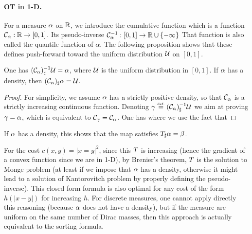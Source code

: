 \paragraph{OT in 1-D.}

For a measure $\alpha$ on $\mathbb{R}$, we introduce the cumulative function
which is a function $\mathcal{C}_{\alpha} : \mathbb{R} \rightarrow [0,1]$.
%
Its pseudo-inverse  $\mathcal{C}_{\alpha}^{-1} : [0,1] \rightarrow \mathbb{R} \cup \{-\infty\}$ 
That function is also called the quantile function of $\alpha$. 
%
The following proposition shows that these defines push-forward toward the uniform distribution $\mathcal{U}$ on $[0,1]$.

\begin{prop}
	One has $(\mathcal{C}_\alpha)^{-1}_\sharp \mathcal{U} = \alpha$,  
	where $\mathcal{U}$ is the uniform distribution in $[0,1]$. 
	If $\alpha$ has a density, then $(\mathcal{C}_\alpha)_\sharp \alpha = \mathcal{U}$.
\end{prop}
\begin{proof}
	For simplicity, we assume $\alpha$ has a strictly positive density, so that $\mathcal{C}_\alpha$ is a strictly increasing continuous function.
	Denoting $\gamma \stackrel{\mbox{\upshape\tiny def.}}{=} (\mathcal{C}_\alpha)^{-1}_\sharp \mathcal{U}$ we aim at proving $\gamma=\alpha$, which is equivalent to 
	$\mathcal{C}_\gamma=\mathcal{C}_\alpha$. One has
	\eq{
		\Cc_\ga(x) = \int_{-\infty}^x \d \ga = \int_\RR 1_{]-\infty,x]} \d( (\Cc_\al^{-1})_\sharp \Uu)
		  	 = \int_0^1 1_{]-\infty,x]}(\Cc_\al^{-1}(z)) \d z
			 = \int_0^1 1_{[0,\Cc_\al(x)]}(z) \d z
			 = \Cc_\al(x)
	}
	where we use the fact that 
\end{proof}

%
If $\alpha$ has a density, this shows that the map
satisfies $T_\sharp \alpha = \beta$. 

For the cost $c(x,y)=|x=y|^2$, since this $T$ is increasing (hence the gradient of a convex function since we are in 1-D), by Brenier's theorem, $T$ is the solution to Monge problem (at least if we impose that $\alpha$ has a density, otherwise it might lead to a solution of Kantorovitch problem by properly defining the pseudo-inverse). 
%
This closed form formula is also optimal for any cost of the form $h(|x-y|)$ for increasing $h$. 
%
For discrete measures, one cannot apply directly this reasoning (because $\alpha$ does not have a density), but if the measure are uniform on the same number of Dirac masses, then this approach is actually equivalent to the sorting formula. 

